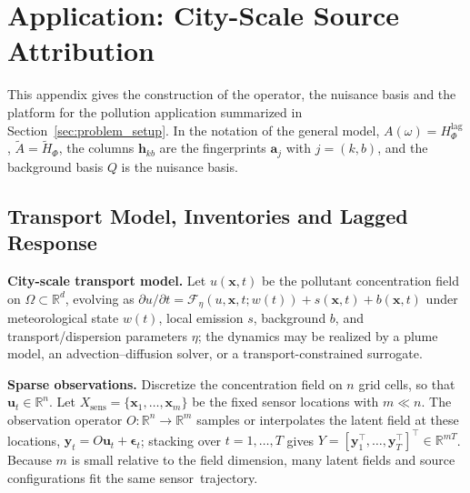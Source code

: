 \section{Application: City-Scale Source Attribution}
\label{app:application}

This appendix gives the construction of the operator, the nuisance basis and the
platform for the pollution application summarized in Section~\ref{sec:problem_setup}.
In the notation of the general model, \(A(\omega)=H_\Phi^{\mathrm{lag}}\),
\(\widetilde A=\widetilde H_\Phi\), the columns \(\mathbf h_{kb}\) are the
fingerprints \(\mathbf a_j\) with \(j=(k,b)\), and the background basis \(Q\) is the
nuisance basis.

\subsection{Transport Model, Inventories and Lagged Response}
\label{app:transport_model}


\noindent\textbf{City-scale transport model.}
Let \(u(\mathbf x,t)\) be the pollutant concentration field on
\(\Omega\subset \mathbb R^d\), evolving as \(\partial u/\partial t
= \mathcal F_\eta(u,\mathbf x,t;w(t)) + s(\mathbf x,t)+b(\mathbf x,t)\) under
meteorological state \(w(t)\), local emission \(s\), background \(b\), and
transport/dispersion parameters \(\eta\); the dynamics may be realized by a plume
model, an advection--diffusion solver, or a transport-constrained surrogate.

\noindent\textbf{Sparse observations.}
Discretize the concentration field on \(n\) grid cells, so that
\(\mathbf u_t\in \mathbb R^n\).  Let
\(X_{\mathrm{sens}}=\{\mathbf x_1,\ldots,\mathbf x_m\}\) be the fixed sensor
locations with \(m\ll n\).  The observation operator
\(O:\mathbb R^n\to \mathbb R^m\) samples or interpolates the latent field at
these locations, \(\mathbf y_t = O\mathbf u_t + \boldsymbol\epsilon_t\); stacking
over \(t=1,\ldots,T\) gives
\(Y = [\mathbf y_1^\top,\ldots,\mathbf y_T^\top]^\top \in \mathbb R^{mT}\).
Because \(m\) is small relative to the field dimension, many latent fields and
source configurations fit the same sensor~trajectory.

